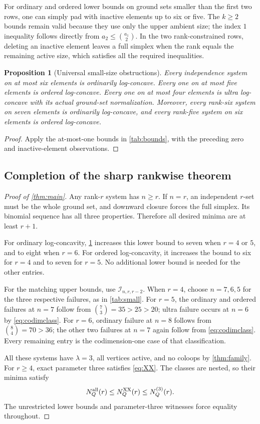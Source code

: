 \documentclass[11pt,letterpaper]{article}
\numberwithin{equation}{section}
\newtheorem{proposition}[theorem]{Proposition}
\theoremstyle{definition}
\theoremstyle{remark}
\newcommand{\I}{\mathcal I}
\begin{document}
For ordinary and ordered lower bounds on ground sets smaller than the
first two rows, one can simply pad with inactive elements up to six or
five. The $k\ge2$ bounds remain valid because they use only the upper
ambient size; the index $1$ inequality follows directly from
$a_2\le\binom{a_1}{2}$. In the two rank-constrained rows, deleting an
inactive element leaves a full simplex when the rank equals the remaining
active size, which satisfies all the required inequalities.

\begin{proposition}[Universal small-size obstructions]\label{prop:lower}
Every independence system on at most six elements is ordinarily
log-concave. Every one on at most five elements is ordered log-concave.
Every one on at most four elements is ultra log-concave with its
actual ground-set normalization. Moreover, every rank-six system
on seven elements is ordinarily log-concave, and every rank-five system
on six elements is ordered log-concave.
\end{proposition}
\begin{proof}
Apply the at-most-one bounds in \cref{tab:bounds}, with the preceding
zero and inactive-element observations.
\end{proof}

\subsection{Completion of the sharp rankwise theorem}
\begin{proof}[Proof of \cref{thm:main}]
Any rank-$r$ system has $n\ge r$. If $n=r$, an independent $r$-set must
be the whole ground set, and downward closure forces the full simplex.
Its binomial sequence has all three properties. Therefore all desired
minima are at least $r+1$.

For ordinary log-concavity, \cref{prop:lower} increases this lower bound
to seven when $r=4$ or $5$, and to eight when $r=6$.
For ordered log-concavity, it increases the bound to six for $r=4$ and
to seven for $r=5$. No additional lower bound is needed for the other
entries.

For the matching upper bounds, use $\I_{n,r,r-2}$.
When $r=4$, choose $n=7,6,5$ for the three respective failures, as in
\cref{tab:small}. For $r=5$, the ordinary and ordered failures at $n=7$
follow from $\binom73=35>25>20$; ultra failure occurs at $n=6$ by
\eqref{eq:codimclass}. For $r=6$, ordinary failure at $n=8$ follows from
$\binom84=70>36$; the other two failures at $n=7$ again follow from
\eqref{eq:codimclass}. Every remaining entry is the codimension-one case
of that classification.

All these systems have $\lambda=3$, all vertices active, and no coloops
by \cref{thm:family}. For $r\ge4$, exact parameter three satisfies
\eqref{eq:XX}. The classes are nested, so their minima satisfy
\[
 N_Q^{\rm all}(r)\le N_Q^{\rm XX}(r)\le N_Q^{(3)}(r).
\]
The unrestricted lower bounds and parameter-three witnesses force equality
throughout.
\end{proof}
\end{document}
